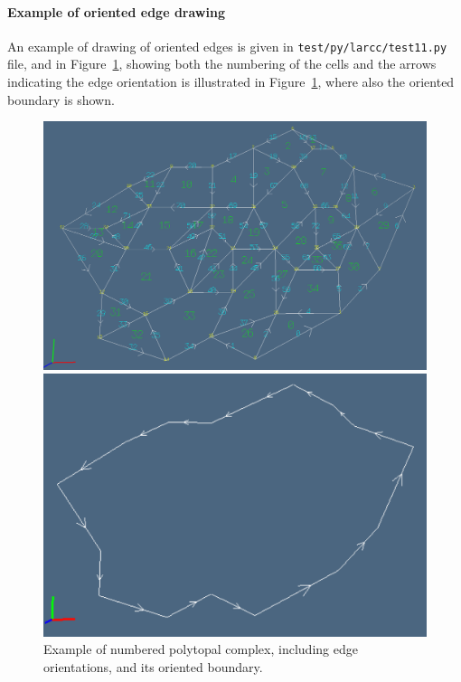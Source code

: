 \documentclass[11pt,oneside]{article}	%
\begin{document}
\paragraph{Example of oriented edge drawing}
An example of drawing of oriented edges is given in \texttt{test/py/larcc/test11.py} file, and in Figure~\ref{numberedcomplex}, showing both the numbering of the cells and the arrows indicating the edge orientation is illustrated in Figure~\ref{numberedcomplex}, where also the oriented boundary is shown.

\begin{figure}[htbp] %
   \centering
   \includegraphics[width=0.9\linewidth]{images/numberedcomplex} 
   
   \includegraphics[width=0.9\linewidth]{images/numberedcomplex1} 
   \caption{Example of numbered polytopal complex, including edge orientations, and its oriented boundary.}
   \label{numberedcomplex}
\end{figure}
\end{document}
